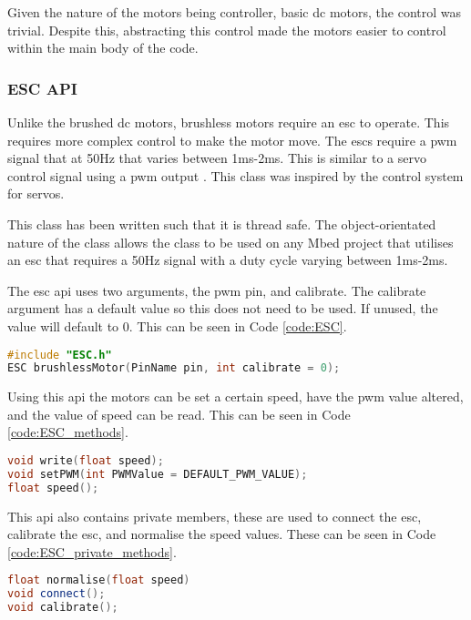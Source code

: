 \documentclass [11pt]{article}
\begin{document}
Given the nature of the motors being controller, basic \gls{dc} motors, the control was trivial. Despite this, abstracting this control made the motors easier to control within the main body of the code. 

\subsubsection{ESC API}

Unlike the brushed \gls{dc} motors, brushless motors require an \gls{esc} to operate. This requires more complex control to make the motor move. The \gls{esc}s require a \gls{pwm} signal that at 50Hz that varies between 1ms-2ms. This is similar to a servo control signal using a \gls{pwm} output \cite{PWM_control_of_an_ESC}. This class was inspired by the control system for servos. 

This class has been written such that it is thread safe. The object-orientated nature of the class allows the class to be used on any Mbed project that utilises an \gls{esc} that requires a 50Hz signal with a duty cycle varying between 1ms-2ms. 

The \gls{esc} \gls{api} uses  two arguments, the \gls{pwm} pin, and calibrate. The calibrate argument has a default value so this does not need to be used. If unused, the value will default to 0. This can be seen in Code \ref{code:ESC}.

\begin{lstlisting}[language=C++,label=code:ESC,caption=ESC Class Constructor]
#include "ESC.h"
ESC brushlessMotor(PinName pin, int calibrate = 0);
\end{lstlisting}

Using this \gls{api} the motors can be set a certain speed, have the \gls{pwm} value altered, and the value of speed can be read. This can be seen in Code \ref{code:ESC_methods}.

\begin{lstlisting}[language=C++,label=code:ESC_methods,caption=ESC Class Public Methods]
void write(float speed);
void setPWM(int PWMValue = DEFAULT_PWM_VALUE);
float speed();
\end{lstlisting}

This \gls{api} also contains private members, these are used to connect the \gls{esc}, calibrate the \gls{esc}, and normalise the speed values. These can be seen in Code \ref{code:ESC_private_methods}.

\begin{lstlisting}[language=C++,label=code:ESC_private_methods,caption=ESC Class Private Methods]
float normalise(float speed)
void connect();
void calibrate();
\end{lstlisting}
\end{document}
